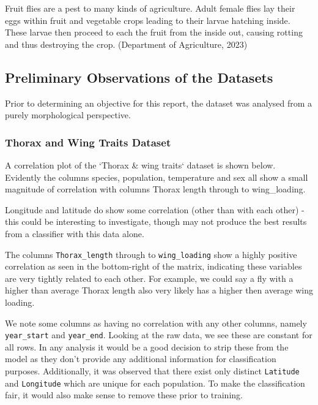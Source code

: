\documentclass{article}
\begin{document}
Fruit flies are a pest to many kinds of agriculture. Adult female flies lay their eggs within fruit and vegetable crops leading to their larvae hatching inside. These larvae then proceed to each the fruit from the inside out, causing rotting and thus destroying the crop. (Department of Agriculture, 2023)

\subsection{Preliminary Observations of the Datasets}

Prior to determining an objective for this report, the dataset was analysed from a purely morphological perspective.

\subsubsection{Thorax and Wing Traits Dataset}

A correlation plot of the `Thorax & wing traits` dataset is shown below. Evidently the columns species, population, temperature and sex all show a small magnitude of correlation with columns Thorax length through to wing_loading. 

Longitude and latitude do show some correlation (other than with each other) - this could be interesting to investigate, though may not produce the best results from a classifier with this data alone.

The columns \texttt{Thorax_length} through to \texttt{wing_loading} show a highly positive correlation as seen in the bottom-right of the matrix, indicating these variables are very tightly related to each other. For example, we could say a fly with a higher than average Thorax length also very likely has a higher then average wing loading.

We note some columns as having no correlation with any other columns, namely \texttt{year_start} and \texttt{year_end}. Looking at the raw data, we see these are constant for all rows. In any analysis it would be a good decision to strip these from the model as they don't provide any additional information for classification purposes. Additionally, it was observed that there exist only distinct \texttt{Latitude} and \texttt{Longitude} which are unique for each population. To make the classification fair, it would also make sense to remove these prior to training.
\end{document}
